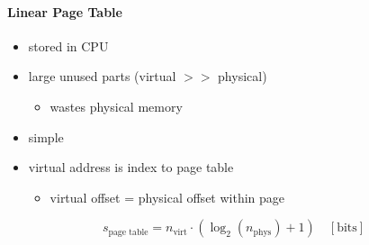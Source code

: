 \paragraph{Linear Page Table}
\begin{itemize}
    \item stored in CPU
    \item large unused parts (virtual $>>$ physical)
          \begin{itemize}
              \item wastes physical memory
          \end{itemize}
    \item simple
    \item virtual address is index to page table
          \begin{itemize}
              \item virtual offset = physical offset within page
          \end{itemize}
\end{itemize}

\noindent\begin{equation*}
    s_{\text{page table}} = n_{\text{virt}}\cdot (\log_2(n_{\text{phys}}) + 1)\quad [\text{bits}]
\end{equation*}

